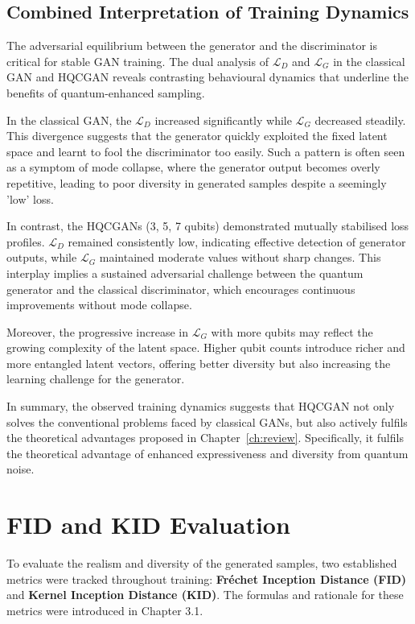 \subsection{Combined Interpretation of Training Dynamics}

The adversarial equilibrium between the generator and the discriminator is critical for stable GAN training. The dual analysis of $\mathcal{L}_D$ and $\mathcal{L}_G$ in the classical GAN and HQCGAN reveals contrasting behavioural dynamics that underline the benefits of quantum-enhanced sampling.

In the classical GAN, the $\mathcal{L}_D$ increased significantly while $\mathcal{L}_G$ decreased steadily. This divergence suggests that the generator quickly exploited the fixed latent space and learnt to fool the discriminator too easily. Such a pattern is often seen as a symptom of mode collapse, where the generator output becomes overly repetitive, leading to poor diversity in generated samples despite a seemingly 'low' loss.

In contrast, the HQCGANs (3, 5, 7 qubits) demonstrated mutually stabilised loss profiles. $\mathcal{L}_D$ remained consistently low, indicating effective detection of generator outputs, while $\mathcal{L}_G$ maintained moderate values without sharp changes. This interplay implies a sustained adversarial challenge between the quantum generator and the classical discriminator, which encourages continuous improvements without mode collapse.

Moreover, the progressive increase in $\mathcal{L}_G$ with more qubits may reflect the growing complexity of the latent space. Higher qubit counts introduce richer and more entangled latent vectors, offering better diversity but also increasing the learning challenge for the generator.

In summary, the observed training dynamics suggests that HQCGAN not only solves the conventional problems faced by classical GANs, but also actively fulfils the theoretical advantages proposed in Chapter~\ref{ch:review}. Specifically, it fulfils the theoretical advantage of enhanced expressiveness and diversity from quantum noise.

\section{FID and KID Evaluation}

To evaluate the realism and diversity of the generated samples, two established metrics were tracked throughout training: \textbf{Fréchet Inception Distance (FID)} and \textbf{Kernel Inception Distance (KID)}. The formulas and rationale for these metrics were introduced in Chapter 3.1.


